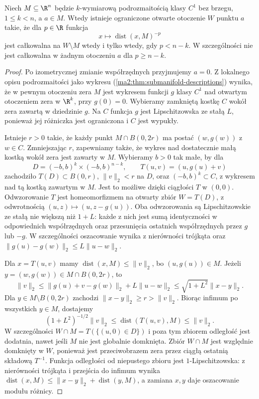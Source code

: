 \begin{twierdzenie}
\label{ma2:thm:improper-submanifold}
Niech $M\subseteq\R^n$ będzie $k$-wymiarową
podrozmaitością klasy $C^1$ bez brzegu,
$1\le k<n$, a $a\in M$.
Wtedy istnieje ograniczone otwarte
otoczenie $W$ punktu $a$ takie, że
dla $p\in\R$ funkcja
\[
 x\longmapsto\operatorname{dist}(x,M)^{-p}
\]
jest całkowalna na $W\setminus M$
wtedy i tylko wtedy, gdy $p<n-k$.
W szczególności nie jest całkowalna
w żadnym otoczeniu $a$ dla $p\ge n-k$.
\end{twierdzenie}
\begin{proof}
Po izometrycznej zmianie współrzędnych
przyjmujemy $a=0$. Z lokalnego opisu
podrozmaitości jako wykresu
(\ref{ma2:thm:submanifold-descriptions})
wynika, że w pewnym otoczeniu zera
$M$ jest wykresem funkcji $g$ klasy
$C^1$ nad otwartym otoczeniem zera
w $\R^k$, przy $g(0)=0$.
Wybieramy zamkniętą kostkę $C$ wokół
zera zawartą w dziedzinie $g$.
Na $C$ funkcja $g$ jest Lipschitzowska
ze stałą $L$, ponieważ jej różniczka
jest ograniczona i $C$ jest wypukły.

Istnieje $r>0$ takie, że każdy punkt
$M\cap B(0,2r)$ ma postać $(w,g(w))$
z $w\in C$. Zmniejszając $r$,
zapewniamy także, że wykres nad
dostatecznie małą kostką wokół zera
jest zawarty w $M$. Wybieramy $b>0$
tak małe, by dla
\[
 D=(-b,b)^k\times(-b,b)^{n-k},\qquad
 T(u,v)=(u,g(u)+v)
\]
zachodziło $T(D)\subset B(0,r)$,
$\|v\|_2<r$ na $D$, oraz
$(-b,b)^k\subset C$, z wykresem nad
tą kostką zawartym w $M$.
Jest to możliwe dzięki ciągłości $T$
w $(0,0)$.
Odwzorowanie $T$ jest homeomorfizmem
na otwarty zbiór $W=T(D)$, z odwrotnością
$(u,z)\mapsto(u,z-g(u))$.
Oba odwzorowania są Lipschitzowskie
ze stałą nie większą niż $1+L$:
każde z nich jest sumą identyczności
w odpowiednich współrzędnych oraz
przesunięcia ostatnich współrzędnych
przez $g$ lub $-g$. W szczególności
oszacowanie wynika z nierówności trójkąta
oraz $\|g(u)-g(w)\|_2\le L\|u-w\|_2$.

Dla $x=T(u,v)$ mamy
$\operatorname{dist}(x,M)\le\|v\|_2$,
bo $(u,g(u))\in M$.
Jeżeli $y=(w,g(w))\in M\cap B(0,2r)$,
to
\[
 \|v\|_2
 \le \|g(u)+v-g(w)\|_2+L\|u-w\|_2
 \le\sqrt{1+L^2}\|x-y\|_2.
\]
Dla $y\in M\setminus B(0,2r)$
zachodzi $\|x-y\|_2\ge r>\|v\|_2$.
Biorąc infimum po wszystkich $y\in M$,
dostajemy
\[
 (1+L^2)^{-1/2}\|v\|_2
 \le\operatorname{dist}(T(u,v),M)
 \le\|v\|_2.
\]
W szczególności $W\cap M=T(\{(u,0)\in D\})$
i poza tym zbiorem odległość jest dodatnia,
nawet jeśli $M$ nie jest globalnie domknięta.
Zbiór $W\cap M$ jest względnie domknięty
w $W$, ponieważ jest przeciwobrazem zera
przez ciągłą ostatnią składową $T^{-1}$.
Funkcja odległości od niepustego zbioru
jest $1$-Lipschitzowska: z nierówności
trójkąta i przejścia do infimum wynika
$\operatorname{dist}(x,M)\le\|x-y\|_2+
\operatorname{dist}(y,M)$, a zamiana $x,y$
daje oszacowanie modułu różnicy.


\end{proof}
